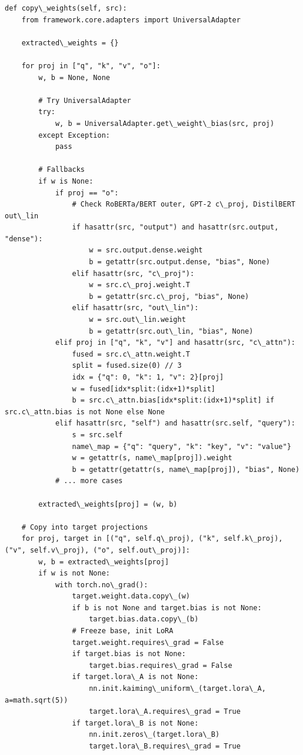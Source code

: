 \begin{lstlisting}
def copy\_weights(self, src):
    from framework.core.adapters import UniversalAdapter
    
    extracted\_weights = {}
    
    for proj in ["q", "k", "v", "o"]:
        w, b = None, None
        
        # Try UniversalAdapter
        try:
            w, b = UniversalAdapter.get\_weight\_bias(src, proj)
        except Exception:
            pass
        
        # Fallbacks
        if w is None:
            if proj == "o":
                # Check RoBERTa/BERT outer, GPT-2 c\_proj, DistilBERT out\_lin
                if hasattr(src, "output") and hasattr(src.output, "dense"):
                    w = src.output.dense.weight
                    b = getattr(src.output.dense, "bias", None)
                elif hasattr(src, "c\_proj"):
                    w = src.c\_proj.weight.T
                    b = getattr(src.c\_proj, "bias", None)
                elif hasattr(src, "out\_lin"):
                    w = src.out\_lin.weight
                    b = getattr(src.out\_lin, "bias", None)
            elif proj in ["q", "k", "v"] and hasattr(src, "c\_attn"):
                fused = src.c\_attn.weight.T
                split = fused.size(0) // 3
                idx = {"q": 0, "k": 1, "v": 2}[proj]
                w = fused[idx*split:(idx+1)*split]
                b = src.c\_attn.bias[idx*split:(idx+1)*split] if src.c\_attn.bias is not None else None
            elif hasattr(src, "self") and hasattr(src.self, "query"):
                s = src.self
                name\_map = {"q": "query", "k": "key", "v": "value"}
                w = getattr(s, name\_map[proj]).weight
                b = getattr(getattr(s, name\_map[proj]), "bias", None)
            # ... more cases
        
        extracted\_weights[proj] = (w, b)
    
    # Copy into target projections
    for proj, target in [("q", self.q\_proj), ("k", self.k\_proj), ("v", self.v\_proj), ("o", self.out\_proj)]:
        w, b = extracted\_weights[proj]
        if w is not None:
            with torch.no\_grad():
                target.weight.data.copy\_(w)
                if b is not None and target.bias is not None:
                    target.bias.data.copy\_(b)
                # Freeze base, init LoRA
                target.weight.requires\_grad = False
                if target.bias is not None:
                    target.bias.requires\_grad = False
                if target.lora\_A is not None:
                    nn.init.kaiming\_uniform\_(target.lora\_A, a=math.sqrt(5))
                    target.lora\_A.requires\_grad = True
                if target.lora\_B is not None:
                    nn.init.zeros\_(target.lora\_B)
                    target.lora\_B.requires\_grad = True
\end{lstlisting}

